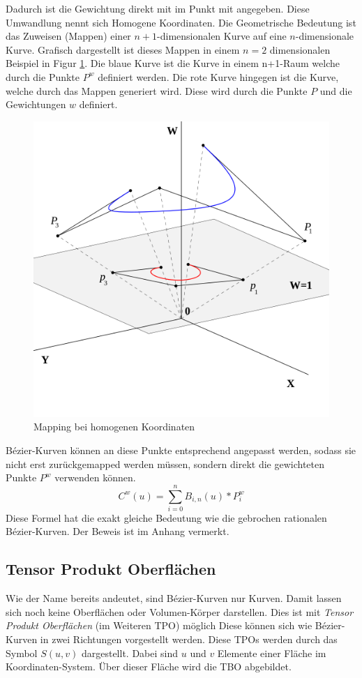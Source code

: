 \documentclass[11pt]{article}
\begin{document}
Dadurch ist die Gewichtung direkt mit im Punkt mit angegeben. 
Diese Umwandlung nennt sich Homogene Koordinaten. 
Die Geometrische Bedeutung ist das Zuweisen (Mappen) einer $n+1$-dimensionalen Kurve auf eine $n$-dimensionale Kurve. 
Grafisch dargestellt ist dieses Mappen in einem $n=2$ dimensionalen Beispiel in Figur \ref{abb:maphomokoord}. 
Die blaue Kurve ist die Kurve in einem n+1-Raum welche durch die Punkte $P^{w}$ definiert werden. 
Die rote Kurve hingegen ist die Kurve, welche durch das Mappen generiert wird. Diese wird durch die Punkte $P$ und die Gewichtungen $w$ definiert. 

\begin{figure}[h]
 \includegraphics[width=.7\textwidth]{./pictures/RationalBezier_mapping.png}
\caption{Mapping bei homogenen Koordinaten}
\label{abb:maphomokoord}
\end{figure}

Bézier-Kurven können an diese Punkte entsprechend angepasst werden, sodass sie nicht erst zurückgemapped werden müssen, sondern direkt die gewichteten Punkte $P^{w}$ verwenden können.
\begin{equation}
C^{w}(u) = \sum_{i=0}^{n} B_{i,n}(u)*P_{i}^{w}
\end{equation}
Diese Formel hat die exakt gleiche Bedeutung wie die gebrochen rationalen Bézier-Kurven.
Der Beweis ist im Anhang vermerkt. 

\subsection{Tensor Produkt Oberflächen}
\label{sec:tensorproduktoberflaechen}

Wie der Name bereits andeutet, sind Bézier-Kurven nur Kurven.
Damit lassen sich noch keine Oberflächen oder Volumen-Körper darstellen. 
Dies ist mit \emph{Tensor Produkt Oberflächen} (im Weiteren TPO) möglich
Diese können sich wie Bézier-Kurven in zwei Richtungen vorgestellt werden. 
Diese TPOs werden durch das Symbol $S(u,v)$ dargestellt. 
Dabei sind $u$ und $v$ Elemente einer Fläche im Koordinaten-System. 
Über dieser Fläche wird die TBO abgebildet. 
\end{document}
